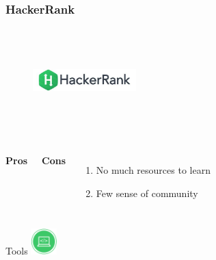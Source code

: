 \documentclass{beamer}
\begin{document}

\begin{frame}
	\frametitle{HackerRank}
	\begin{figure}[t]
		\href{https://www.hackerrank.com}{\includegraphics[width=4cm,height=4cm,keepaspectratio]{images/judges/hackerrank}}
	\end{figure}
	
	\begin{columns}[c] %
		\textbf{Pros}
		\textbf{Cons}
		\begin{enumerate}
			\item No much resources to learn
			\item Few sense of community
		\end{enumerate}
	\end{columns}
	\begin{block}{Tools}
	\center
	\href{https://www.hackerrank.com/jobs} {\includegraphics[width=1cm,height=1cm,keepaspectratio]{images/tools/jobs}}
	\end{block}

\end{frame}


\end{document}
